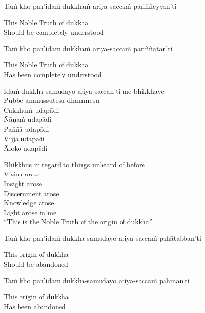 Taṁ kho pan'idaṁ dukkhaṁ ariya-saccaṁ pariññeyyan'ti

\begin{english}
  This Noble Truth of dukkha\makeatletter\hyperlink{endnote56-appendix}\makeatother\\
  Should be completely understood
\end{english}

Taṁ kho pan'idaṁ dukkhaṁ ariya-saccaṁ pariññātan'ti

\begin{english}
  This Noble Truth of dukkha\\
  Has been completely understood
\end{english}

Idaṁ dukkha-samudayo ariya-saccan'ti me bhikkhave\\
Pubbe ananussutesu dhammesu\\
Cakkhuṁ udapādi\\
Ñāṇaṁ udapādi\\
Paññā udapādi\\
Vijjā udapādi\\
Āloko udapādi

\begin{english-verses}
  Bhikkhus in regard to things unheard of before\\
  Vision arose\\
  Insight arose\\
  Discernment arose\\
  Knowledge arose\\
  Light arose in me\\
  ``This is the Noble Truth of the origin of dukkha''
\end{english-verses}

Taṁ kho pan'idaṁ dukkha-samudayo ariya-saccaṁ pahātabban'ti

\begin{english}
  This origin of dukkha\\
  Should be abandoned
\end{english}

Taṁ kho pan'idaṁ dukkha-samudayo ariya-saccaṁ pahīnan'ti

\begin{english}
  This origin of dukkha\\
  Has been abandoned
\end{english}

